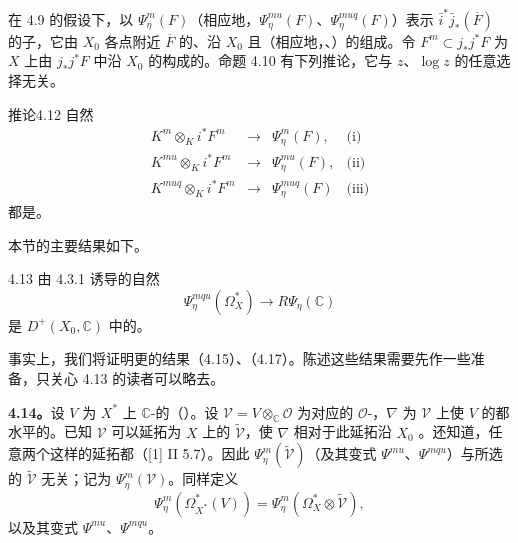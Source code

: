 在 4.9 的假设下，以 $\Psi_\eta^m(F)$（相应地，$\Psi_\eta^{mu}(F)$、$\Psi_\eta^{muq}(F)$）表示 $\bar i^*\bar j_*(\overline F)$ 的子，它由 $X_0$ 各点附近 $\overline F$ 的、沿 $X_0$ 且（相应地，、）的组成。令 $F^m\subset j_*j^*F$ 为 $X$ 上由 $j_*j^*F$ 中沿 $X_0$ 的构成的。命题 4.10 有下列推论，它与 $z$、$\log z$ 的任意选择无关。

\begin{SGAresult}{推论}{4.12}
自然
\[
\begin{array}{rcll}
 K^m\otimes_Ki^*F^m&\longrightarrow&\Psi_\eta^m(F),&\text{(i)}\\
 K^{mu}\otimes_Ki^*F^m&\longrightarrow&\Psi_\eta^{mu}(F),&\text{(ii)}\\
 K^{muq}\otimes_Ki^*F^m&\longrightarrow&\Psi_\eta^{muq}(F)&\text{(iii)}
\end{array}
\]
都是。
\end{SGAresult}

本节的主要结果如下。
\begin{SGAresult}{}{4.13}
由 4.3.1 诱导的自然
\[
 \Psi_\eta^{mqu}(\Omega_X^*)\longrightarrow R\Psi_\eta(\mathbb C)\tag{4.13.1}
\]
是 $D^+(X_0,\mathbb C)$ 中的。
\end{SGAresult}

事实上，我们将证明更的结果（4.15）、（4.17）。陈述这些结果需要先作一些准备，只关心 4.13 的读者可以略去。

\textbf{4.14。}设 $V$ 为 $X^*$ 上 $\mathbb C$-的（）。设 $\mathscr V=V\otimes_{\mathbb C}\mathscr O$ 为对应的 $\mathscr O$-，$\nabla$ 为 $\mathscr V$ 上使 $V$ 的都水平的。已知 $\mathscr V$ 可以延拓为 $X$ 上的 $\widetilde{\mathscr V}$，使 $\nabla$ 相对于此延拓沿 $X_0$ 。还知道，任意两个这样的延拓都（[1] II 5.7）。因此 $\Psi_\eta^m(\widetilde{\mathscr V})$（及其变式 $\Psi^{mu}$、$\Psi^{mqu}$）与所选的 $\widetilde{\mathscr V}$ 无关；记为 $\Psi_\eta^m(\mathscr V)$。同样定义
\[
 \Psi_\eta^m(\Omega_{X^*}^*(V))=\Psi_\eta^m(\Omega_X^*\otimes\widetilde{\mathscr V}),
\]
以及其变式 $\Psi^{mu}$、$\Psi^{mqu}$。

